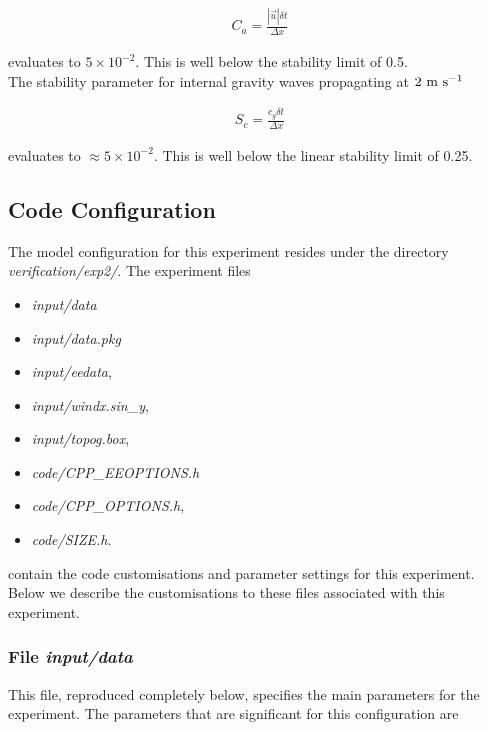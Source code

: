 \begin{eqnarray}
\label{EQ:eg-fourlayer-cfl_stability}
C_{a} = \frac{| \vec{u} | \delta t}{ \Delta x}
\end{eqnarray}

\noindent evaluates to $5 \times 10^{-2}$. This is well below the stability 
limit of 0.5.
\\

\noindent The stability parameter for internal gravity waves
propagating at $2~{\rm m}~{\rm s}^{-1}$ 

\begin{eqnarray}
\label{EQ:eg-fourlayer-igw_stability}
S_{c} = \frac{c_{g} \delta t}{ \Delta x}
\end{eqnarray}

\noindent evaluates to $\approx 5 \times 10^{-2}$. This is well below the linear
stability limit of 0.25.
  
\subsection{Code Configuration}
\label{www:tutorials}
\label{SEC:eg_fourl_code_config}

The model configuration for this experiment resides under the 
directory {\it verification/exp2/}.  The experiment files 
\begin{itemize}
\item {\it input/data}
\item {\it input/data.pkg}
\item {\it input/eedata},
\item {\it input/windx.sin\_y},
\item {\it input/topog.box},
\item {\it code/CPP\_EEOPTIONS.h}
\item {\it code/CPP\_OPTIONS.h},
\item {\it code/SIZE.h}. 
\end{itemize}
contain the code customisations and parameter settings for this
experiment. Below we describe the customisations to these files
associated with this experiment.

\subsubsection{File {\it input/data}}
\label{www:tutorials}

This file, reproduced completely below, specifies the main parameters 
for the experiment. The parameters that are significant for this configuration
are

